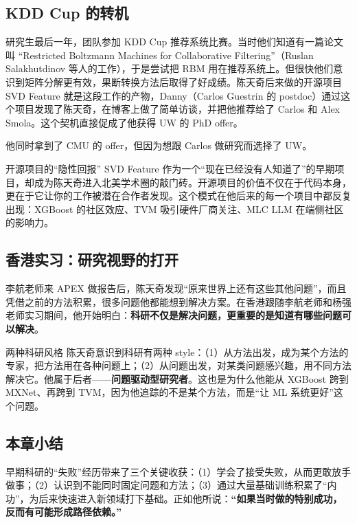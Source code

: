 \documentclass[a4paper]{article}
\begin{document}
\subsection{KDD Cup 的转机}

研究生最后一年，团队参加 KDD Cup 推荐系统比赛。当时他们知道有一篇论文叫 ``Restricted Boltzmann Machines for Collaborative Filtering''（Ruslan Salakhutdinov 等人的工作），于是尝试把 RBM 用在推荐系统上。但很快他们意识到矩阵分解更有效，果断转换方法后取得了好成绩。陈天奇后来做的开源项目 SVD Feature 就是这段工作的产物，Danny（Carlos Guestrin 的 postdoc）通过这个项目发现了陈天奇，在博客上做了简单访谈，并把他推荐给了 Carlos 和 Alex Smola。这个契机直接促成了他获得 UW 的 PhD offer。

他同时拿到了 CMU 的 offer，但因为想跟 Carlos 做研究而选择了 UW。

\begin{knowledgebox}{开源项目的``隐性回报''}
SVD Feature 作为一个``现在已经没有人知道了''的早期项目，却成为陈天奇进入北美学术圈的敲门砖。开源项目的价值不仅在于代码本身，更在于它让你的工作被潜在合作者发现。这个模式在他后来的每一个项目中都反复出现：XGBoost 的社区效应、TVM 吸引硬件厂商关注、MLC LLM 在端侧社区的影响力。
\end{knowledgebox}

\subsection{香港实习：研究视野的打开}

李航老师来 APEX 做报告后，陈天奇发现``原来世界上还有这些其他问题''，而且凭借之前的方法积累，很多问题他都能想到解决方案。在香港跟随李航老师和杨强老师实习期间，他开始明白：\textbf{科研不仅是解决问题，更重要的是知道有哪些问题可以解决}。

\begin{knowledgebox}{两种科研风格}
陈天奇意识到科研有两种 style：（1）从方法出发，成为某个方法的专家，把方法用在各种问题上；（2）从问题出发，对某类问题感兴趣，用不同方法解决它。他属于后者------\textbf{问题驱动型研究者}。这也是为什么他能从 XGBoost 跨到 MXNet、再跨到 TVM，因为他追踪的不是某个方法，而是``让 ML 系统更好''这个问题。
\end{knowledgebox}

\subsection{本章小结}

早期科研的``失败''经历带来了三个关键收获：（1）学会了接受失败，从而更敢放手做事；（2）认识到不能同时固定问题和方法；（3）通过大量基础训练积累了``内功''，为后来快速进入新领域打下基础。正如他所说：\textbf{``如果当时做的特别成功，反而有可能形成路径依赖。''}
\end{document}
